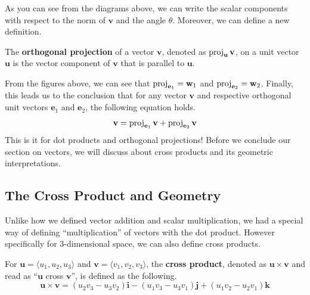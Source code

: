 \documentclass[../../../main.tex]{subfiles}
\begin{document}
As you can see from the diagrams above, we can write the scalar
components with respect to the norm of $\mathbf{v}$ and the
angle $\theta$. Moreover, we can define a new definition.

\begin{definition}{}{}
The \textbf{orthogonal projection} of a vector $\mathbf{v}$,
denoted as $\operatorname{proj}_\mathbf{u} \mathbf{v}$, on a unit vector
$\mathbf{u}$ is the vector component of $\mathbf{v}$ that is parallel
to $\mathbf{u}$.
\end{definition}

From the figures above, we can see that $\operatorname{proj}_{\mathbf{e}_1} =
\mathbf{w}_1$ and $\operatorname{proj}_{\mathbf{e}_2} = \mathbf{w}_2$.
Finally, this leads us to the conclusion that for any vector
$\mathbf{v}$ and respective orthogonal unit vectors $\mathbf{e}_1$
and $\mathbf{e}_2$, the following equation holds.
\[
\mathbf{v}
= \operatorname{proj}_{\mathbf{e}_1} \mathbf{v} + \operatorname{proj}_{\mathbf{e}_2} \mathbf{v}
\]
This is it for dot products and orthogonal projections! Before
we conclude our section on vectors, we will discuss about cross
products and its geometric interpretations.

\subsection{The Cross Product and Geometry}

Unlike how we defined vector addition and scalar multiplication,
we had a special way of defining ``multiplication'' of vectors
with the dot product. However specifically for $3$-dimensional
space, we can also define cross products.

\begin{definition}{}{}
For $\mathbf{u} = \langle u_1, u_2, u_3 \rangle$ and $\mathbf{v} =
\langle v_1, v_2, v_3 \rangle$, the \textbf{cross product},
denoted as $\mathbf{u} \times \mathbf{v}$ and read as
``$\mathbf{u}$ cross $\mathbf{v}$'', is defined as the following.
\vspace{-0.8\baselineskip}
\[
\mathbf{u} \times \mathbf{v}
= (u_2v_3 - u_3v_2) \mathbf{i} - (u_1v_3 - u_3v_1) \mathbf{j}
    + (u_1v_2 - u_2v_1) \mathbf{k}
\]
\end{definition}
\end{document}

